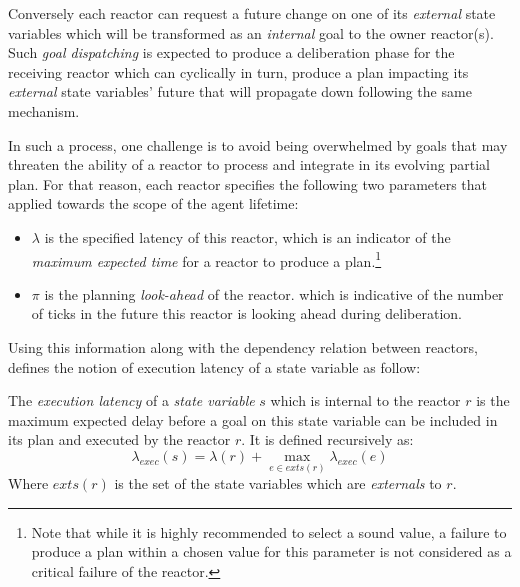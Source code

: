 Conversely each reactor can request a future change on one of its {\em
  external} state variables which will be transformed as an {\em
  internal} goal to the owner reactor(s).  Such \emph{goal
  dispatching} is expected to produce a deliberation phase for the
receiving reactor which can cyclically in turn, produce a plan
impacting its {\em external} state variables' future that will
propagate down following the same mechanism.

In such a process, one challenge is to avoid being overwhelmed by
goals that may threaten the ability of a reactor to process and
integrate in its evolving partial plan. For that reason, each reactor
specifies the following two parameters that applied towards the scope
of the agent lifetime:

\begin{itemize}

\item $\lambda$ is the specified latency of this reactor, which is an
  indicator of the \emph{maximum expected time} for a reactor to
  produce a plan.\footnote{Note that while it is highly recommended to
    select a sound value, a failure to produce a plan within a chosen
    value for this parameter is not considered as a critical failure
    of the reactor.}

\item $\pi$ is the planning \emph{look-ahead} of the reactor. which is
  indicative of the number of ticks in the future this reactor is
  looking ahead during deliberation.

\end{itemize}

Using this information along with the dependency relation between
reactors, \rx defines the notion of execution latency of a state
variable as follow:

\begin{definition}
  The {\em execution latency} of a {\em state variable} $s$ which is
  internal to the reactor $r$ is the maximum expected delay before a
  goal on this state variable can be included in its plan and executed
  by the reactor $r$. It is defined recursively as: 
  \begin{equation*}
    \lambda_{exec}(s) = \lambda(r) + \max_{e \in exts(r)}
    \lambda_{exec}(e) 
  \end{equation*}
  Where  $exts(r)$ is the set of the state variables which are
  {\em externals} to $r$. 
\end{definition}

